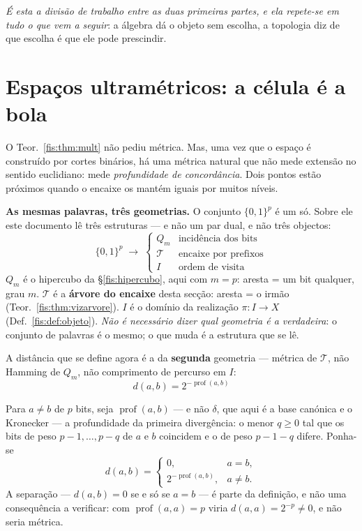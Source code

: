 \documentclass[livro.tex]{subfiles}
\begin{document}
\medskip\noindent\emph{É esta a divisão de trabalho entre as duas primeiras
partes, e ela repete-se em tudo o que vem a seguir}: a álgebra dá o objeto sem
escolha, a topologia diz de que escolha é que ele pode prescindir.

\section{Espaços ultramétricos: a célula é a bola}\label{fis:ultra}

\noindent O Teor.~\ref{fis:thm:mult} não pediu métrica. Mas, uma vez que o espaço
é construído por cortes binários, há uma métrica natural que não mede extensão
no sentido euclidiano: mede \emph{profundidade de concordância}. Dois pontos
estão próximos quando o encaixe os mantém iguais por muitos níveis.

\medskip\noindent\textbf{As mesmas palavras, três geometrias.} O conjunto
$\{0,1\}^p$ é um só. Sobre ele este documento lê três estruturas --- e não um
par dual, e não três objectos:
\[
\boxed{\;
\{0,1\}^p
\;\longrightarrow\;
\begin{cases}
Q_m & \text{incidência dos bits}\\
\mathcal{T} & \text{encaixe por prefixos}\\
I & \text{ordem de visita}
\end{cases}
\;}
\]
$Q_m$ é o hipercubo da §\ref{fis:hipercubo}, aqui com $m=p$: aresta = um bit
qualquer, grau $m$. $\mathcal{T}$ é a \textbf{árvore do encaixe} desta secção:
aresta = o irmão (Teor.~\ref{fis:thm:vizarvore}). $I$ é o domínio da realização
$\pi\colon I\to X$ (Def.~\ref{fis:def:objeto}). \emph{Não é necessário dizer
qual geometria é a verdadeira}: o conjunto de palavras é o mesmo; o que muda é
a estrutura que se lê.

\medskip\noindent A distância que se define agora é a da \textbf{segunda}
geometria --- métrica de $\mathcal{T}$, não Hamming de $Q_m$, não comprimento de
percurso em $I$:
\[
\boxed{\;d(a,b)=2^{-\operatorname{prof}(a,b)}\;}
\]

\begin{definicao}\label{fis:def:arvore}
Para $a\neq b$ de $p$ bits, seja $\operatorname{prof}(a,b)$ --- e não $\delta$,
que aqui é a base canónica e o Kronecker --- a profundidade da primeira
divergência: o menor $q\ge0$ tal que os bits de peso $p-1,\dots,p-q$ de $a$ e $b$
coincidem e o de peso $p-1-q$ difere. Ponha-se
\[
d(a,b)=\begin{cases}0,&a=b,\\[2pt] 2^{-\operatorname{prof}(a,b)},&a\neq b.\end{cases}
\]
A separação --- $d(a,b)=0$ se e só se $a=b$ --- é parte da definição, e não uma
consequência a verificar: com $\operatorname{prof}(a,a)=p$ viria
$d(a,a)=2^{-p}\neq0$, e não seria métrica.
\end{definicao}
\end{document}
